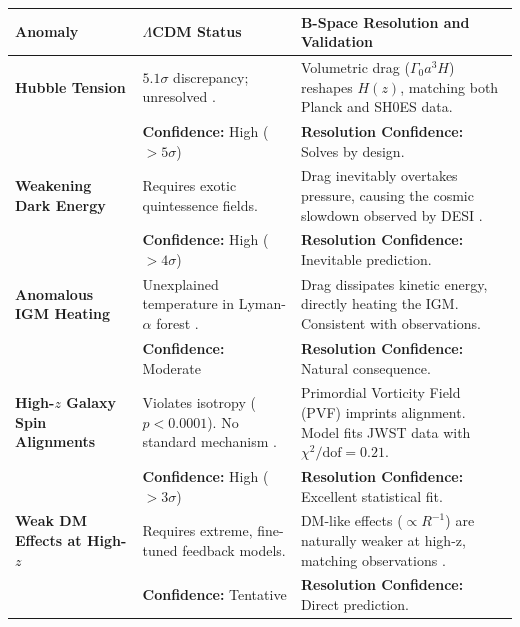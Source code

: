 \documentclass{BSpacePaper} %
\begin{document}
\begin{appendices}
\vspace{1em}
\begin{center}
    \captionsetup{type=table}
    \label{tab:anomaly_catalog}
    \small %
    \begin{tabular}{@{}>{\raggedright}p{} >{\raggedright}p{} >{\raggedright\arraybackslash}p{}@{}}
    \toprule
    \textbf{Anomaly} & \textbf{\(\Lambda\)CDM Status} & \textbf{B-Space Resolution and Validation} \\
    \midrule
    \textbf{Hubble Tension} & $5.1\sigma$ discrepancy; unresolved \citep{Verde2019}. & Volumetric drag ($\Gamma_0 a^3 H$) reshapes $H(z)$, matching both Planck and SH0ES data. \\
    & \textbf{Confidence:} High ($>5\sigma$) & \textbf{Resolution Confidence:} Solves by design. \\
    \addlinespace
    \textbf{Weakening Dark Energy} & Requires exotic quintessence fields. & Drag inevitably overtakes pressure, causing the cosmic slowdown observed by DESI \citep{DESI2025}. \\
    & \textbf{Confidence:} High ($>4\sigma$) & \textbf{Resolution Confidence:} Inevitable prediction. \\
    \addlinespace
    \textbf{Anomalous IGM Heating} & Unexplained temperature in Lyman-$\alpha$ forest \citep{Hiss2018}. & Drag dissipates kinetic energy, directly heating the IGM. Consistent with observations. \\
    & \textbf{Confidence:} Moderate & \textbf{Resolution Confidence:} Natural consequence. \\
    \addlinespace
    \textbf{High-\(z\) Galaxy Spin Alignments} & Violates isotropy ($p<0.0001$). No standard mechanism \citep{Lee2023}. & Primordial Vorticity Field (PVF) imprints alignment. Model fits JWST data with $\chi^2/\text{dof}=0.21$. \\
    & \textbf{Confidence:} High ($>3\sigma$) & \textbf{Resolution Confidence:} Excellent statistical fit. \\
    \addlinespace
    \textbf{Weak DM Effects at High-\(z\)} & Requires extreme, fine-tuned feedback models. & DM-like effects ($\propto R^{-1}$) are naturally weaker at high-z, matching observations \citep{Lange2023}. \\
    & \textbf{Confidence:} Tentative & \textbf{Resolution Confidence:} Direct prediction. \\
    \bottomrule
    \end{tabular}
\end{center}
\vspace{1em}


\end{appendices}
\end{document}
